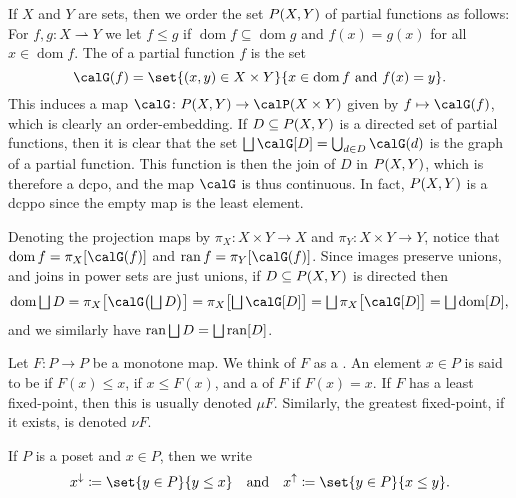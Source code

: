 \documentclass[a4paper, 11pt, article, danish, oneside]{memoir}
\DeclarePairedDelimiter{\auxdelimparen}{(}{)}
\DeclarePairedDelimiter{\auxdelimbracket}{[}{]}
\newcommand{\powerset}[2][]{\calP\auxdelimparen[#1]{#2}}
\DeclareMathOperator*{\smallbigsqcup}{\textstyle\bigsqcup}
\DeclareMathOperator*{\bigdjoin}{\mathchoice
    {\smallbigsqcup}%
    {\bigsqcup}%
    {\bigsqcup}%
    {\bigsqcup}%
}
\DeclareMathOperator*{\smallbigcup}{\textstyle\bigcup}
\DeclareMathOperator*{\bigunion}{\mathchoice
    {\smallbigcup}%
    {\bigcup}%
    {\bigcup}%
    {\bigcup}%
}
\newcommand{\defeq}{\coloneqq}
\newcommand{\image}[2][]{\auxdelimbracket[#1]{#2}}
\newcommand{\pto}{\rightharpoonup}
\newcommand{\dom}{\operatorname{dom}}
\newcommand{\ran}{\operatorname{ran}}
\renewcommand{\prod}{\times}
\newcommand{\pmaps}[3][]{%
    \ifstrempty{#1}%
        {%
            P(#2,#3)
        }{%
            P_{#1}(#2,#3)
        }%
}
\begin{document}
\begin{examplebreak}
    If $X$ and $Y$ are sets, then we order the set $\pmaps{X}{Y}$ of partial functions as follows: For $f,g \colon X \pto Y$ we let $f \leq g$ if $\dom f \subseteq \dom g$ and $f(x) = g(x)$ for all $x \in \dom f$. The  of a partial function $f$ is the set
    \begin{equation*}
        \graph{f} = \set{(x,y) \in X \prod Y}{x \in \dom f \text{ and } f(x) = y}.
    \end{equation*}
    This induces a map $\calG \colon \pmaps{X}{Y} \to \powerset{X \prod Y}$ given by $f \mapsto \graph{f}$, which is clearly an order-embedding. If $D \subseteq \pmaps{X}{Y}$ is a directed set of partial functions, then it is clear that the set $\bigdjoin \calG\image{D} = \bigunion_{d \in D} \graph{d}$ is the graph of a partial function. This function is then the join of $D$ in $\pmaps{X}{Y}$, which is therefore a dcpo, and the map $\calG$ is thus continuous. In fact, $\pmaps{X}{Y}$ is a dcppo since the empty map is the least element.

    Denoting the projection maps by $\pi_X \colon X \prod Y \to X$ and $\pi_Y \colon X \prod Y \to Y$, notice that $\dom f = \pi_X\image{\graph{f}}$ and $\ran f = \pi_Y\image{\graph{f}}$. Since images preserve unions, and joins in power sets are just unions, if $D \subseteq \pmaps{X}{Y}$ is directed then
    \begin{equation*}
        \dom \bigdjoin D
            = \pi_X\image[\big]{\graph[\big]{\bigdjoin D}}
            = \pi_X\image[\big]{\bigdjoin \calG\image{D}}
            = \bigdjoin \pi_X\image[\big]{\calG\image{D}}
            = \bigdjoin \dom\image{D},
    \end{equation*}
    and we similarly have $\ran \bigdjoin D = \bigdjoin \ran\image{D}$.
\end{examplebreak}


Let $F \colon P \to P$ be a monotone map. We think of $F$ as a . An element $x \in P$ is said to be  if $F(x) \leq x$,  if $x \leq F(x)$, and a  of $F$ if $F(x) = x$. If $F$ has a least fixed-point, then this is usually denoted $\mu F$. Similarly, the greatest fixed-point, if it exists, is denoted $\nu F$.


If $P$ is a poset and $x \in P$, then we write
%
\begin{equation*}
    x^\downarrow
        \defeq \set{y \in P}{y \leq x}
    \quad \text{and} \quad
    x^\uparrow
        \defeq \set{y \in P}{x \leq y}.
\end{equation*}
\end{document}
